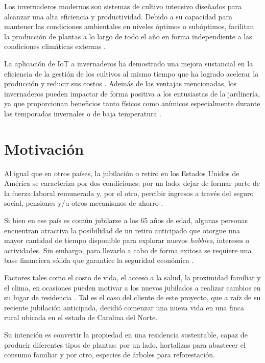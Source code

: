 Los invernaderos modernos son sistemas de cultivo intensivo diseñados para alcanzar una alta eficiencia y productividad. Debido a su capacidad para mantener las condiciones ambientales en niveles óptimos o subóptimos, facilitan la producción de plantas a lo largo de todo el año en forma independiente a las condiciones climáticas externas \citep{HistoryofControlledEnvironmentHorticultureGreenhouses}.

La aplicación de IoT a invernaderos ha demostrado una mejora sustancial en la eficiencia de la gestión de los cultivos al mismo tiempo que ha logrado acelerar la producción y reducir sus costos \citep{IoTparaInvernaderos}. Además de las ventajas mencionadas, los invernaderos pueden impactar de forma positiva a los entusiastas de la jardinería, ya que proporcionan beneficios tanto físicos como anímicos especialmente durante las temporadas invernales o de baja temperatura \citep{GreenHousesForHomeOwnersAndGardeners}. 


\section{Motivación}
\label{Motivación}

Al igual que en otros países, la jubilación o retiro en los Estados Unidos de América se caracteriza por dos condiciones: por un lado, dejar de formar parte de la fuerza laboral remunerada y, por el otro, percibir ingresos a través del seguro social, pensiones y/u otros mecanismos de ahorro \citep{csreports:1}. 

Si bien en ese país es común jubilarse a los 65 años de edad, algunas personas encuentran atractiva la posibilidad de un retiro anticipado que otorgue una mayor cantidad de tiempo disponible para explorar nuevos \textit{hobbies}, intereses o actividades. Sin embargo, para llevarlo a cabo de forma exitosa se requiere una base financiera sólida que garantice la seguridad económica \citep{yahoo:1}. 

Factores tales como el costo de vida, el acceso a la salud, la proximidad familiar y el clima, en ocasiones pueden motivar a los nuevos jubilados a realizar cambios en su lugar de residencia  \citep{RelocatingAfterRetiring} \citep{Kim2021}. Tal es el caso del cliente de este proyecto, que a raíz de su reciente jubilación anticipada, decidió comenzar una nueva vida en una finca rural ubicada en el estado de Carolina del Norte. 

Su intención es convertir la propiedad en una residencia sustentable, capaz de producir diferentes tipos de plantas: por un lado, hortalizas para abastecer el consumo familiar y por otro, especies de árboles para reforestación. 

